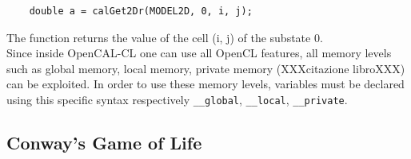 \begin{lstlisting} 
	double a = calGet2Dr(MODEL2D, 0, i, j);
\end{lstlisting}

The function returns the value of the cell (i, j) of the substate 0.\\ Since inside OpenCAL-CL one can use all OpenCL features, all memory levels such as global memory, local memory, private
memory (XXXcitazione libroXXX) can be exploited. In order to use these memory levels, variables must be declared using this specific syntax respectively
\verb'__global', \verb'__local', \verb'__private'.

\subsection{Conway's Game of Life}
 
